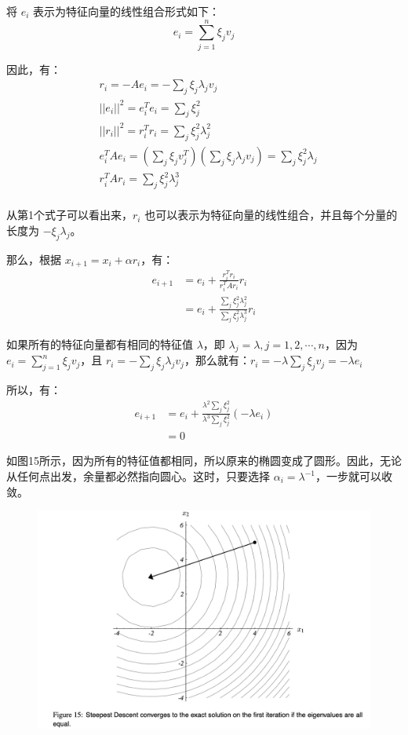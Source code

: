 \documentclass[12pt]{article}
\begin{document}
将 $e_i$ 表示为特征向量的线性组合形式如下：
$$
e_i = \sum_{j=1}^n \xi_j v_j
$$

因此，有：
\begin{align*}
&r_i = -A e_i = -\sum_j\xi_j\lambda_jv_j \\
&||e_i||^2 = e^T_ie_i = \sum_j\xi_j^2 \\
&||r_i||^2 = r^T_ir_i = \sum_j\xi_j^2\lambda_j^2 \\
&e^T_iAe_i = (\sum_j\xi_jv_j^T)(\sum_j\xi_j\lambda_jv_j) = \sum_j \xi_j^2\lambda_j \\
&r^T_iAr_i = \sum_j\xi_j^2\lambda_j^3 \\
\end{align*}

从第1个式子可以看出来，$r_i$ 也可以表示为特征向量的线性组合，并且每个分量的长度为 $-\xi_j\lambda_j$。

那么，根据 $x_{i+1} = x_i + \alpha r_i$，有：
\begin{align*}
e_{i+1} &= e_i + \frac{r^T_ir_i}{r^T_iAr_i}r_i \\
	   &= e_i + \frac{\sum_j\xi^2_j\lambda^2_j}{\sum_j\xi^2_j\lambda^3_j}r_i
\end{align*}

如果所有的特征向量都有相同的特征值 $\lambda$，即 $\lambda_j = \lambda, j = 1, 2, \cdots, n$，因为 $e_i = \sum_{j=1}^n \xi_j v_j$，且 $r_i =  -\sum_j\xi_j\lambda_jv_j $，那么就有：$r_i =  -\lambda \sum_j\xi_jv_j = -\lambda e_i$

所以，有：
\begin{align*}
e_{i+1} &= e_i + \frac{\lambda^2\sum_j\xi^2_j}{\lambda^3\sum_j\xi^2_j}(-\lambda e_i) \\
&= 0
\end{align*}

如图15所示，因为所有的特征值都相同，所以原来的椭圆变成了圆形。因此，无论从任何点出发，余量都必然指向圆心。这时，只要选择 $\alpha_i = \lambda^{-1}$，一步就可以收敛。
\begin{figure}[H]
    \centering
    \includegraphics[width=1\textwidth]{fig/CG_Convergence_SD_2.png}
\end{figure}
\end{document}
